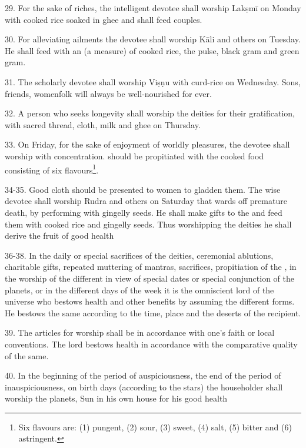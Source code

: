 29. For the sake of riches, the intelligent devotee shall worship Lakṣmī \etc
on Monday with cooked rice soaked in ghee and shall feed  couples.

30. For alleviating ailments the devotee shall worship Kāli and others on
Tuesday. He shall feed  with an  (a measure) of cooked
rice, the pulse, black gram and green gram.

31. The scholarly devotee shall worship Viṣṇu with curd-rice on Wednesday. Sons,
friends, womenfolk \etc will always be well-nourished for ever.

32. A person who seeks longevity shall worship the deities for their
gratification, with sacred thread, cloth, milk and ghee on Thursday.

33. On Friday, for the sake of enjoyment of worldly pleasures, the devotee shall
worship  with concentration.  should be propitiated with
the cooked food consisting of six flavours\footnote{Six flavours are: (1)
pungent, (2) sour, (3) sweet, (4) salt, (5) bitter and (6) astringent.}.

34-35. Good cloth should be presented to women to gladden them. The wise devotee
shall worship Rudra and others on Saturday that wards off premature death, by
performing  with gingelly seeds. He shall make gifts to
the  and feed them with cooked rice and gingelly seeds. Thus
worshipping the deities he shall derive the fruit of good health \etc

36-38. In the daily or special sacrifices of the deities, ceremonial ablutions,
charitable gifts, repeated muttering of mantras, sacrifices, propitiation of
the , in the worship of the different  in view of
special dates or special conjunction of the planets, or in the different days of
the week it is the omniscient lord of the universe who bestows health and other
benefits by assuming the different forms. He bestows the same according to
the time, place and the deserts of the recipient.

39. The articles for worship shall be in accordance with one’s faith or local
conventions. The lord bestows health \etc in accordance with the comparative
quality of the same.

40. In the beginning of the period of auspiciousness, the end of the period of
inauspiciousness, on birth days (according to the stars) \etc the householder
shall worship the planets, Sun \etc in his own house for his good health \etc

